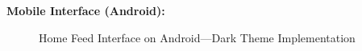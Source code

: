 \textbf{Mobile Interface (Android):}
\begin{figure}[!htbp]
    \centering
    \hspace{0.05\textwidth}
    \caption{Home Feed Interface on Android---Dark Theme Implementation}
    \label{fig:android_home}
\end{figure}

